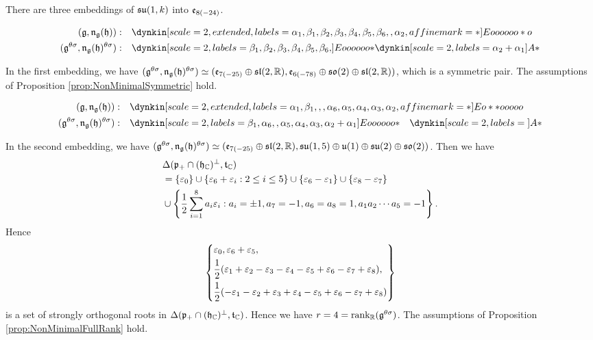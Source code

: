 There are three embeddings of $\mathfrak{su}(1, k)$ into $\mathfrak{e}_{8(-24)}$.

\begin{align*}
	(\lie{g}, \lieNorm_{\lie{g}}(\lie{h})): \quad & \dynkin[scale=2, extended, labels={\alpha_1, \beta_1, \beta_2, \beta_3, \beta_4, \beta_5, \beta_6, , \alpha_2}, affine mark=*]{E}{oooooo*o} \\
	(\lie{g}^{\theta\sigma}, \lieNorm_{\lie{g}}(\lie{h})^{\theta\sigma}): \quad & \dynkin[scale=2, labels={\beta_1, \beta_2, \beta_3, \beta_4, \beta_5, \beta_6, }]{E}{oooooo*}
	\dynkin[scale=2, labels={\alpha_2 + \alpha_1}]{A}{*}
\end{align*}

In the first embedding, we have $(\mathfrak{g}^{\theta\sigma}, \mathfrak{n}_{\mathfrak{g}}(\mathfrak{h})^{\theta\sigma}) \simeq (\mathfrak{e}_{7(-25)} \oplus \mathfrak{sl}(2,\mathbb{R}), \mathfrak{e}_{6(-78)} \oplus \mathfrak{so}(2) \oplus \mathfrak{sl}(2,\mathbb{R}))$, which is a symmetric pair.
The assumptions of Proposition \ref{prop:NonMinimalSymmetric} hold.

\begin{align*}
	(\lie{g}, \lieNorm_{\lie{g}}(\lie{h})): \quad & \dynkin[scale=2, extended, labels={\alpha_1, \beta_1, , , \alpha_6, \alpha_5, \alpha_4, \alpha_3, \alpha_2}, affine mark=*]{E}{o**ooooo} \\
	(\lie{g}^{\theta\sigma}, \lieNorm_{\lie{g}}(\lie{h})^{\theta\sigma}): \quad & \dynkin[scale=2, labels={\beta_1, \alpha_6, , \alpha_5, \alpha_4, \alpha_3, \alpha_2 + \alpha_1}]{E}{oooooo*}
	\quad \dynkin[scale=2, labels={}]{A}{*}
\end{align*}

In the second embedding, we have $(\mathfrak{g}^{\theta\sigma}, \mathfrak{n}_{\mathfrak{g}}(\mathfrak{h})^{\theta\sigma}) \simeq (\mathfrak{e}_{7(-25)} \oplus \mathfrak{sl}(2,\mathbb{R}), \mathfrak{su}(1, 5) \oplus \mathfrak{u}(1) \oplus \mathfrak{su}(2) \oplus \mathfrak{so}(2))$.
Then we have
\begin{align*}
	&\Delta(\mathfrak{p}_+ \cap (\mathfrak{h}_{\mathbb{C}})^\perp, \mathfrak{t}_{\mathbb{C}}) \\
	&= \left\{\varepsilon_0 \right\} \cup \left\{\varepsilon_6 + \varepsilon_i: 2\leq i \leq 5 \right\} \cup \left\{\varepsilon_6 - \varepsilon_1 \right\} \cup \left\{\varepsilon_8 - \varepsilon_7 \right\} \\
	&\cup \left\{\frac{1}{2}\sum_{i=1}^8 a_i \varepsilon_i: a_i = \pm 1, a_7=-1,a_6=a_8=1,a_1a_2\cdots a_5 = -1 \right\}.
\end{align*}
Hence
\begin{align*}
	\left\{\begin{aligned}
		&\varepsilon_0, \varepsilon_6 + \varepsilon_5, \\
		&\frac{1}{2}(\varepsilon_1 + \varepsilon_2 - \varepsilon_3 - \varepsilon_4 - \varepsilon_5 + \varepsilon_6 - \varepsilon_7 + \varepsilon_8), \\
		&\frac{1}{2}(-\varepsilon_1 - \varepsilon_2 + \varepsilon_3 + \varepsilon_4 - \varepsilon_5 + \varepsilon_6 - \varepsilon_7 + \varepsilon_8)
	\end{aligned} \right\}
\end{align*}
is a set of strongly orthogonal roots in $\Delta(\mathfrak{p}_+ \cap (\mathfrak{h}_{\mathbb{C}})^\perp, \mathfrak{t}_{\mathbb{C}})$.
Hence we have $r = 4 = \operatorname{rank}_{\mathbb{R}}(\mathfrak{g}^{\theta\sigma})$.
The assumptions of Proposition \ref{prop:NonMinimalFullRank} hold.

